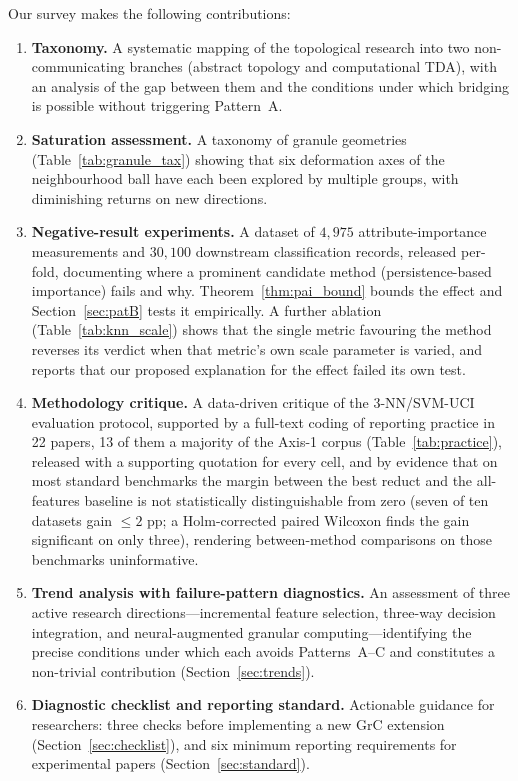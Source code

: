 Our survey makes the following contributions:
\begin{enumerate}
  \item \textbf{Taxonomy.}  A systematic mapping
        of the topological research into two non-communicating branches
        (abstract topology and computational TDA), with an analysis of the gap
        between them and the conditions under which bridging is possible without
        triggering Pattern~A.
  \item \textbf{Saturation assessment.}  A taxonomy of granule
        geometries (Table~\ref{tab:granule_tax}) showing that six deformation
        axes of the neighbourhood ball have each been explored by multiple
        groups, with diminishing returns on new directions.
  \item \textbf{Negative-result experiments.}  A dataset of $4{,}975$
        attribute-importance measurements and $30{,}100$ downstream
        classification records, released per-fold, documenting where a
        prominent candidate method (persistence-based importance) fails and why.
        Theorem~\ref{thm:pai_bound} bounds the effect and
        Section~\ref{sec:patB} tests it empirically.  A further ablation
        (Table~\ref{tab:knn_scale}) shows that the single metric favouring
        the method reverses its verdict when that metric's own scale
        parameter is varied, and reports that our proposed explanation for
        the effect failed its own test.
  \item \textbf{Methodology critique.}  A data-driven critique of the
        3-NN/SVM-UCI evaluation protocol, supported by a full-text coding of
        reporting practice in 22 papers, 13 of them a majority of the
        Axis-1 corpus (Table~\ref{tab:practice}), released with a supporting
        quotation for every cell, and by evidence
        that on most standard benchmarks the margin between the best reduct
        and the all-features baseline is not statistically distinguishable
        from zero
        (seven of ten datasets gain $\leq 2$ pp; a Holm-corrected paired
        Wilcoxon finds the gain significant on only three), rendering
        between-method comparisons on those benchmarks uninformative.
  \item \textbf{Trend analysis with failure-pattern diagnostics.}
        An assessment of three active research directions---incremental
        feature selection, three-way decision integration, and
        neural-augmented granular computing---identifying the precise
        conditions under which each avoids Patterns~A--C and constitutes a
        non-trivial contribution (Section~\ref{sec:trends}).
  \item \textbf{Diagnostic checklist and reporting standard.}
        Actionable guidance for researchers: three checks before implementing
        a new GrC extension (Section~\ref{sec:checklist}), and six minimum
        reporting requirements for experimental papers
        (Section~\ref{sec:standard}).
\end{enumerate}

